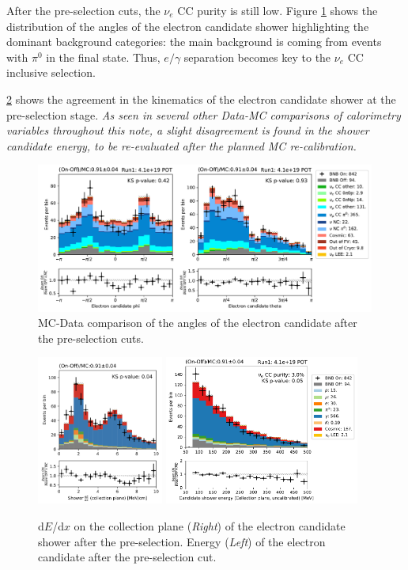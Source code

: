 After the pre-selection cuts, the $\nu_e$ CC purity is still low. Figure \ref{fig:pre_shower_E_pdg} shows the distribution of the angles of the electron candidate shower highlighting the dominant background categories: the main background is coming from events with $\pi^0$ in the final state. Thus, $e/\gamma$ separation becomes key to the $\nu_e$ CC inclusive selection.

\cref{fig:e_cand_Calo} shows the agreement in the kinematics of the electron candidate shower at the pre-selection stage. \emph{As seen in several other Data-MC comparisons of calorimetry variables throughout this note, a slight disagreement is found in the shower candidate energy, to be re-evaluated after the planned MC re-calibration.}


\begin{figure}[H]
    \centering
    \includegraphics[height=4.9cm]{NueCCsel/Images/run1/pre_angles.pdf}
    \caption{MC-Data comparison of the angles of the electron candidate after the pre-selection cuts.}
    \label{fig:pre_shower_E_pdg}
\end{figure}

\begin{figure}[H]
    \centering
    \includegraphics[height=4.9cm]{NueCCsel/Images/run1/e_cand_dedxColl}
     \includegraphics[height=4.9cm]{NueCCsel/Images/run1/pre_shower_E_pdg.pdf}
    
    \caption{d$E$/d$x$ on the collection plane (\emph{Right}) of the electron candidate shower after the pre-selection. Energy (\emph{Left}) of the electron candidate after the pre-selection cut.}
    \label{fig:e_cand_Calo}
\end{figure}



